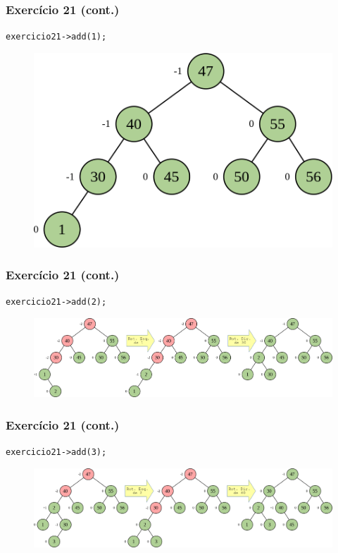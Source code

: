 \documentclass[aspectratio=169]{beamer}
\begin{document}
\begin{frame}[fragile]\frametitle{Exercício 21 (cont.)}
\texttt{exercicio21->add(1);}
\begin{figure}[h]
	\centering
	\includegraphics[height=0.35\paperheight]{imagens/avl-exercicio21h.png}
\end{figure}
\end{frame}

\begin{frame}[fragile]\frametitle{Exercício 21 (cont.)}
\texttt{exercicio21->add(2);}
\begin{figure}[h]
	\centering
	\includegraphics[height=0.45\paperheight]{imagens/avl-exercicio21i.png}
\end{figure}
\end{frame}

\begin{frame}[fragile]\frametitle{Exercício 21 (cont.)}
\texttt{exercicio21->add(3);}
\begin{figure}[h]
	\centering
	\includegraphics[height=0.45\paperheight]{imagens/avl-exercicio21j.png}
\end{figure}
\end{frame}
\end{document}
